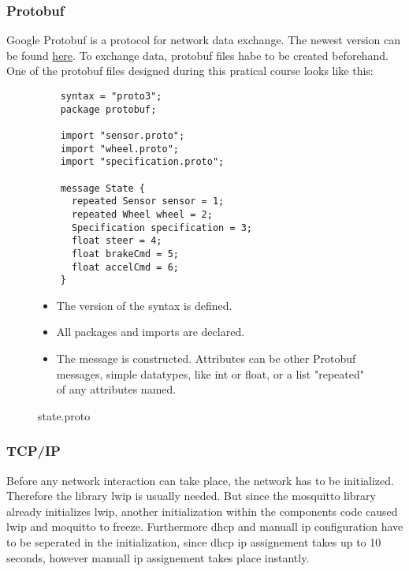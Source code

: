 \documentclass[paper=a4, fontsize=11pt]{scrartcl}
\begin{document}
  \subsubsection{Protobuf}
Google Protobuf is a protocol for network data exchange.
The newest version can be found \href{https://github.com/google/protobuf}{here}.
To exchange data, protobuf files habe to be created beforehand.
One of the protobuf files designed during this pratical course looks like this: 
  \begin{figure}[!h]
  \begin{minipage}{0.5\textwidth}
  \centering
    \begin{verbatim}
	syntax = "proto3";
	package protobuf;
	
	import "sensor.proto";
	import "wheel.proto";
	import "specification.proto";
	
	message State {
	  repeated Sensor sensor = 1;
	  repeated Wheel wheel = 2;
	  Specification specification = 3;
	  float steer = 4;
	  float brakeCmd = 5;
	  float accelCmd = 6;
	}
    \end{verbatim}
  \end{minipage}
  \begin{minipage}{0.5\textwidth}
    \begin{itemize}
\item The version of the syntax is defined.
\item All packages and imports are declared.
\item The message is constructed. Attributes can be other Protobuf messages, simple datatypes, like int or float, or a list "repeated" of any attributes named.
    \end{itemize}
  \end{minipage}
    \caption{\tiny state.proto}
  \end{figure}
  \subsubsection{TCP/IP}
Before any network interaction can take place, the network has to be initialized. Therefore the library lwip is usually needed. But since the mosquitto library already initializes lwip, another initialization within the components code caused lwip and moquitto to freeze.\newline
Furthermore dhcp and manuall ip configuration have to be seperated in the initialization, since dhcp ip assignement takes up to 10 seconds, however manuall ip assignement takes place instantly.
\end{document}
